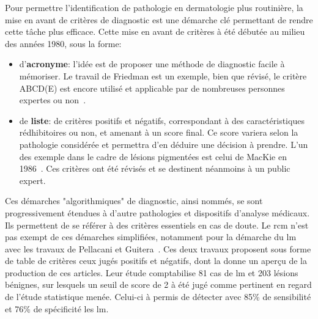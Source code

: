 \renewcommand{\thechapter}{\roman{chapter}}
\setcounter{chapter}{3}

\label{chap:preamble_microscopy}
Pour permettre l'identification de pathologie en dermatologie plus routinière, la mise en avant de critères de diagnostic est une démarche clé permettant de rendre cette tâche plus efficace. Cette mise en avant de critères à été débutée au milieu des années 1980, sous la forme:
\begin{itemize}
    \item d'\textbf{acronyme}: l'idée est de proposer une méthode de diagnostic facile à mémoriser. Le travail de Friedman est un exemple, bien que révisé, le critère ABCD(E) est encore utilisé et applicable par de nombreuses personnes expertes ou non~\cite{Friedman1985}.
    \item de \textbf{liste}: de critères positifs et négatifs, correspondant à des caractéristiques rédhibitoires ou non, et amenant à un score final. Ce score variera selon la pathologie considérée et permettra d'en déduire une décision à prendre. L'un des exemple dans le cadre de lésions pigmentées est celui de MacKie en 1986~\cite{mackie1986}. Ces critères ont été révisés et se destinent néanmoins à un public expert. 
\end{itemize}\par

Ces démarches "algorithmiques" de diagnostic, ainsi nommés, se sont progressivement étendues à d'autre pathologies et dispositifs d'analyse médicaux. Ils permettent de se référer à des critères essentiels en cas de doute. Le \gls{rcm} n'est pas exempt de ces démarches simplifiées, notamment pour la démarche du \gls{lm} avec les travaux de Pellacani et Guitera~\cite{Pellacani2007, Guitera2010}. Ces deux travaux proposent sous forme de table de critères ceux jugés positifs et négatifs, dont la  donne un aperçu de la production de ces articles. Leur étude comptabilise 81 cas de \gls{lm} et 203 lésions bénignes, sur lesquels un seuil de score de 2 à été jugé comme pertinent en regard de l'étude statistique menée. Celui-ci à permis de détecter avec 85\% de sensibilité et 76\% de spécificité les \gls{lm}.\par

